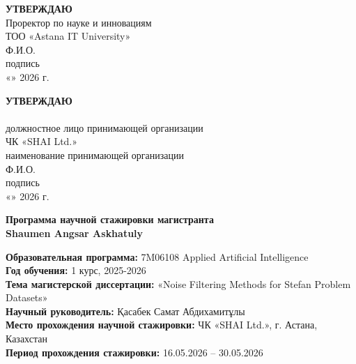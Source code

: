 \documentclass[12pt,a4paper]{article}
\begin{document}
\thispagestyle{empty}

\noindent
\begin{minipage}[t]{0.48\textwidth}
\textbf{УТВЕРЖДАЮ}\\[2mm]
Проректор по науке и инновациям\\
ТОО «Astana IT University»\\[5mm]
\underline{\hspace{3cm}} Ф.И.О.\\[2mm]
\underline{\hspace{3cm}} подпись\\[2mm]
«\underline{\hspace{1cm}}» \underline{\hspace{3cm}} 2026 г.
\end{minipage}%
\hfill
\begin{minipage}[t]{0.48\textwidth}
\textbf{УТВЕРЖДАЮ}\\[2mm]
\underline{\hspace{5cm}}\\
{\footnotesize должностное лицо принимающей организации}\\
ЧК «SHAI Ltd.»\\
{\footnotesize наименование принимающей организации}\\[5mm]
\underline{\hspace{3cm}} Ф.И.О.\\[2mm]
\underline{\hspace{3cm}} подпись\\[2mm]
«\underline{\hspace{1cm}}» \underline{\hspace{3cm}} 2026 г.
\end{minipage}

\vspace{2.5cm}

\begin{center}
\textbf{\large Программа научной стажировки магистранта}\\[5mm]
\textbf{\large Shaumen Angsar Askhatuly}
\end{center}

\vspace{1.5cm}

\noindent
\textbf{Образовательная программа:} 7M06108 Applied Artificial Intelligence\\[2mm]
\textbf{Год обучения:} 1 курс, 2025-2026\\[2mm]
\textbf{Тема магистерской диссертации:} «Noise Filtering Methods for Stefan Problem Datasets»\\[2mm]
\textbf{Научный руководитель:} Қасабек Самат Абдихамитұлы\\[2mm]
\textbf{Место прохождения научной стажировки:} ЧК «SHAI Ltd.», г. Астана, Казахстан\\[2mm]
\textbf{Период прохождения стажировки:} 16.05.2026 -- 30.05.2026
\end{document}
